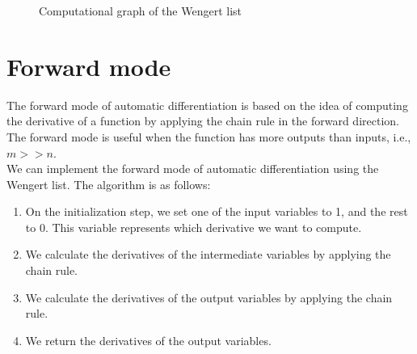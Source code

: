 \begin{figure}[H]
    \centering
    \label{fig:my_label}
    \caption{Computational graph of the Wengert list}
\end{figure}

\section{Forward mode}

The forward mode of automatic differentiation is based on the idea of computing the derivative
of a function by applying the chain rule in the forward direction. The forward mode is useful
when the function has more outputs than inputs, i.e., $m >> n$.\\

We can implement the forward mode of automatic differentiation using the Wengert list. 
The algorithm is as follows:

\begin{enumerate}
    \item On the initialization step, we set one of the input variables to 1, and the rest to 0.
    This variable represents which derivative we want to compute.

    \item We calculate the derivatives of the intermediate variables by applying the chain rule.
    
    \item We calculate the derivatives of the output variables by applying the chain rule.
    
    \item We return the derivatives of the output variables.
\end{enumerate}

